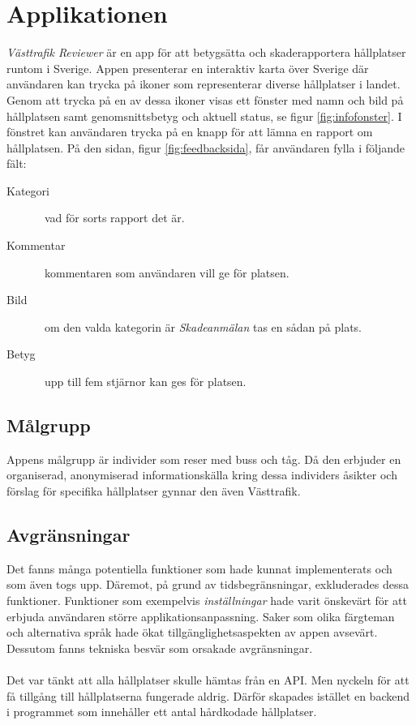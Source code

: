 \documentclass{article}
\begin{document}
\section*{Applikationen}
\textit{Västtrafik Reviewer} är en app för att betygsätta och skaderapportera hållplatser runtom i Sverige. Appen presenterar en interaktiv karta över Sverige där användaren kan trycka på ikoner som representerar diverse hållplatser i landet. Genom att trycka på en av dessa ikoner visas ett fönster med namn och bild på hållplatsen samt genomsnittsbetyg och aktuell status, se figur \ref{fig:infofonster}. I fönstret kan användaren trycka på en knapp för att lämna en rapport om hållplatsen. På den sidan, figur \ref{fig:feedbacksida}, får användaren fylla i följande fält:
\begin{description}
\item[Kategori] \textendash\ vad för sorts rapport det är.
\item[Kommentar] \textendash\ kommentaren som användaren vill ge för platsen.
\item[Bild] \textendash\ om den valda kategorin är \textit{Skadeanmälan} tas en sådan på plats.
\item[Betyg] \textendash\ upp till fem stjärnor kan ges för platsen.
\end{description}

\subsection*{Målgrupp}
Appens målgrupp är individer som reser med buss och tåg. Då den erbjuder en organiserad, anonymiserad informationskälla kring dessa individers åsikter och förslag för specifika hållplatser gynnar den även Västtrafik. 

\subsection*{Avgränsningar}
Det fanns många potentiella funktioner som hade kunnat implementerats och som även togs upp. Däremot, på grund av tidsbegränsningar, exkluderades dessa funktioner. Funktioner som exempelvis \textit{inställningar} hade varit önskevärt för att erbjuda användaren större applikationsanpassning. Saker som olika färgteman och alternativa språk hade ökat tillgänglighetsaspekten av appen avsevärt. Dessutom fanns tekniska besvär som orsakade avgränsningar.
\\\\
Det var tänkt att alla hållplatser skulle hämtas från en API. Men nyckeln för att få tillgång till hållplatserna fungerade aldrig. Därför skapades istället en backend i programmet som innehåller ett antal hårdkodade hållplatser. 
\end{document}
